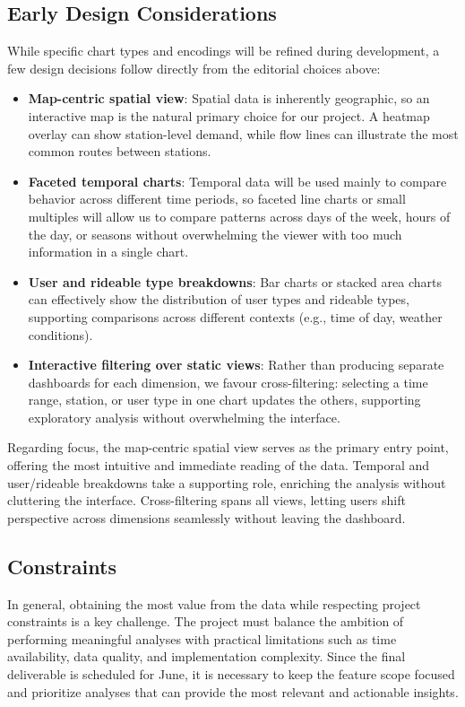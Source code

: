 \subsection{Early Design Considerations}
While specific chart types and encodings will be refined during development, a few design decisions follow directly from the editorial choices above:
\begin{itemize}
  \item \textbf{Map-centric spatial view}: Spatial data is inherently geographic, so an interactive map is the natural primary choice for our project.
  A heatmap overlay can show station-level demand, while flow lines can illustrate the most common routes between stations.
  \item \textbf{Faceted temporal charts}: Temporal data will be used mainly to compare behavior across different time periods, so faceted line charts or 
  small multiples will allow us to compare patterns across days of the week, hours of the day, or seasons without overwhelming the viewer with too much information in a single chart.
  \item \textbf{User and rideable type breakdowns}: Bar charts or stacked area charts can effectively show the distribution of user types and rideable types, supporting comparisons across different contexts (e.g., time of day, weather conditions).
  \item \textbf{Interactive filtering over static views}: Rather than producing separate dashboards for each dimension, we favour cross-filtering: selecting a time range, station, or user type in one chart updates the others, supporting exploratory analysis without overwhelming the interface.
\end{itemize}
Regarding focus, the map-centric spatial view serves as the primary entry point, offering the most intuitive and immediate reading of the data.
Temporal and user/rideable breakdowns take a supporting role, enriching the analysis without cluttering the interface.
Cross-filtering spans all views, letting users shift perspective across dimensions seamlessly without leaving the dashboard.

\subsection{Constraints}
In general, obtaining the most value from the data while respecting project constraints is a key challenge.
The project must balance the ambition of performing meaningful analyses with practical limitations such as time availability, data quality, and implementation complexity. 
Since the final deliverable is scheduled for June, it is necessary to keep the feature scope focused and prioritize analyses that can provide the most relevant and actionable insights.


